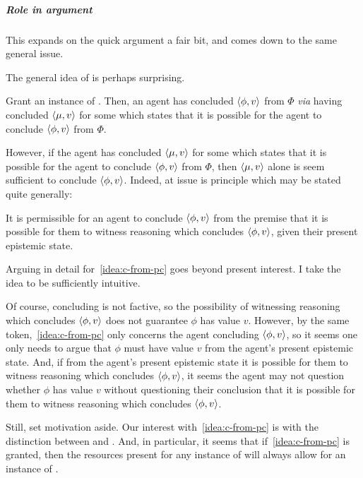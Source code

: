 \subparagraph*{Role in argument}

\begin{note}
  \color{red}
  This expands on the quick argument a fair bit, and comes down to the same general issue.
\end{note}

\begin{note}
  The general idea of \adB{} is perhaps surprising.

  Grant an instance of \adB{}.
  Then, an agent has concluded \(\langle \phi, v \rangle\) from \(\Phi\) \emph{via} having concluded \(\langle \mu, v \rangle\) for some  which states that it is possible for the agent to conclude \(\langle \phi, v \rangle\) from \(\Phi\).

  However, if the agent has concluded \(\langle \mu, v \rangle\) for some  which states that it is possible for the agent to conclude \(\langle \phi, v \rangle\) from \(\Phi\), then \(\langle \mu, v \rangle\) alone is seem sufficient to conclude \(\langle \phi, v \rangle\).
  Indeed, at issue is principle which may be stated quite generally:

  \begin{idea}
    \label{idea:c-from-pc}
    It is permissible for an agent to conclude \(\langle \phi, v \rangle\) from the premise that it is possible for them to witness reasoning which concludes \(\langle \phi, v \rangle\), given their present epistemic state.
  \end{idea}

  Arguing in detail for~\autoref{idea:c-from-pc} goes beyond present interest.
  I take the idea to be sufficiently intuitive.

  Of course, concluding is not factive, so the possibility of witnessing reasoning which concludes \(\langle \phi, v \rangle\) does not guarantee \(\phi\) has value \(v\).
  However, by the same token,~\autoref{idea:c-from-pc} only concerns the agent concluding \(\langle \phi, v \rangle\), so it seems one only needs to argue that \(\phi\) must have value \(v\) from the agent's present epistemic state.
  And, if from the agent's present epistemic state it is possible for them to witness reasoning which concludes \(\langle \phi, v \rangle\), it seems the agent may not question whether \(\phi\) has value \(v\) without questioning their conclusion that it is possible for them to witness reasoning which concludes \(\langle \phi, v \rangle\).

  Still, set motivation aside.
  Our interest with~\autoref{idea:c-from-pc} is with the distinction between \adA{} and \adB{}.
  And, in particular, it seems that if~\autoref{idea:c-from-pc} is granted, then the resources present for any instance of \adB{} will always allow for an instance of \adA{}.


\end{note}
